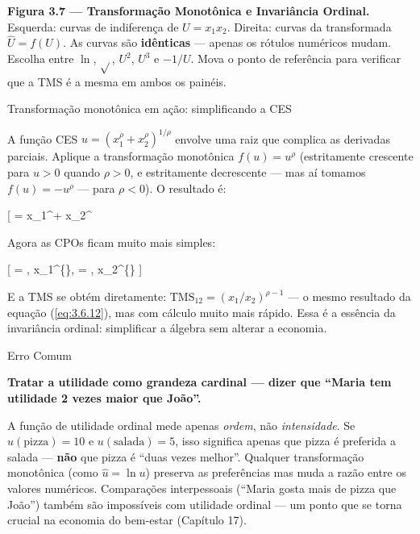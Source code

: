 \documentclass[11pt,twoside,openright]{book}
\begin{document}
\textbf{Figura 3.7 --- Transformação Monotônica e Invariância Ordinal.}
Esquerda: curvas de indiferença de \(U = x_1 x_2\). Direita: curvas da
transformada \(\hat{U} = f(U)\). As curvas são \textbf{idênticas} ---
apenas os rótulos numéricos mudam. Escolha entre \(\ln\), \(\sqrt{}\),
\(U^2\), \(U^3\) e \(-1/U\). Mova o ponto de referência para verificar
que a TMS é a mesma em ambos os painéis.

\begin{examplebox}{Transformação monotônica em ação: simplificando a CES}

A função CES \(u = (x_1^\rho + x_2^\rho)^{1/\rho}\) envolve uma raiz que
complica as derivadas parciais. Aplique a transformação monotônica
\(f(u) = u^\rho\) (estritamente crescente para \(u > 0\) quando
\(\rho > 0\), e estritamente decrescente --- mas aí tomamos
\(f(u) = -u^\rho\) --- para \(\rho < 0\)). O resultado é:

{[}  = x\_1\^{}\rho + x\_2\^{}\rho {]}

Agora as CPOs ficam muito mais simples:

{[}  = \rho , x\_1\^{}\{\},
\qquad {} = \rho , x\_2\^{}\{\}
{]}

E a TMS se obtém diretamente: \(\text{TMS}_{12} = (x_1/x_2)^{\rho-1}\)
--- o mesmo resultado da equação (\ref{eq:3.6.12}), mas com cálculo
muito mais rápido. Essa é a essência da invariância ordinal: simplificar
a álgebra sem alterar a economia.

\end{examplebox}

\begin{warningbox}{Erro Comum}

\textbf{Tratar a utilidade como grandeza cardinal --- dizer que ``Maria
tem utilidade 2 vezes maior que João''.}

A função de utilidade ordinal mede apenas \emph{ordem}, não
\emph{intensidade}. Se \(u(\text{pizza}) = 10\) e
\(u(\text{salada}) = 5\), isso significa apenas que pizza é preferida a
salada --- \textbf{não} que pizza é ``duas vezes melhor''. Qualquer
transformação monotônica (como \(\hat{u} = \ln u\)) preserva as
preferências mas muda a razão entre os valores numéricos. Comparações
interpessoais (``Maria gosta mais de pizza que João'') também são
impossíveis com utilidade ordinal --- um ponto que se torna crucial na
economia do bem-estar (Capítulo 17).

\end{warningbox}
\end{document}
